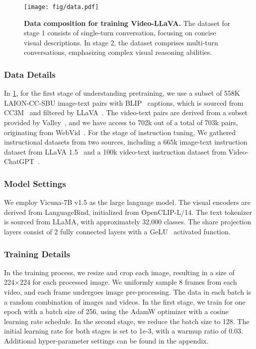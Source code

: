 \begin{figure}
\vspace{-0.4cm} 
\centering
    \texttt{[image: fig/data.pdf]}     
    \caption{\textbf{Data composition for training Video-LLaVA.} The dataset for stage 1 consists of single-turn conversation, focusing on concise visual descriptions. In stage 2, the dataset comprises multi-turn conversations, emphasizing complex visual reasoning abilities.}
    \label{fig:data}
\vspace{-0.4cm} 
\end{figure}

\subsubsection{Data Details} In \ref{fig:data}, for the first stage of understanding pretraining, we use a subset of 558K LAION-CC-SBU image-text pairs with BLIP~\cite{li2022blip} captions, which is sourced from CC3M~\cite{sharma2018conceptual} and filtered by LLaVA~\cite{liu2023visual}. The video-text pairs are derived from a subset provided by Valley~\cite{luo2023valley}, and we have access to 702k out of a total of 703k pairs, originating from WebVid~\cite{bain2021frozen}. For the stage of instruction tuning, We gathered instructional datasets from two sources, including a 665k image-text instruction dataset from LLaVA 1.5~\cite{liu2023improved} and a 100k video-text instruction dataset from Video-ChatGPT~\cite{maaz2023video}.

\subsubsection{Model Settings} We employ Vicuna-7B v1.5 as the large language model. The visual encoders are derived from LanguageBind, initialized from OpenCLIP-L/14. The text tokenizer is sourced from LLaMA, with approximately 32,000 classes. The share projection layers consist of 2 fully connected layers with a GeLU~\cite{hendrycks2016gaussian} activated function.

\subsubsection{Training Details} In the training process, we resize and crop each image, resulting in a size of 224×224 for each processed image. We uniformly sample 8 frames from each video, and each frame undergoes image pre-processing. The data in each batch is a random combination of images and videos. In the first stage, we train for one epoch with a batch size of 256, using the AdamW optimizer with a cosine learning rate schedule. In the second stage, we reduce the batch size to 128. The initial learning rate for both stages is set to 1e-3, with a warmup ratio of 0.03. Additional hyper-parameter settings can be found in the appendix.

